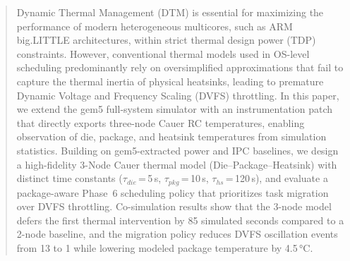 \begin{abstract}
Dynamic Thermal Management (DTM) is essential for maximizing the performance of modern heterogeneous multicores, such as ARM big.LITTLE architectures, within strict thermal design power (TDP) constraints. However, conventional thermal models used in OS-level scheduling predominantly rely on oversimplified approximations that fail to capture the thermal inertia of physical heatsinks, leading to premature Dynamic Voltage and Frequency Scaling (DVFS) throttling. In this paper, we extend the gem5 full-system simulator with an instrumentation patch that directly exports three-node Cauer RC temperatures, enabling observation of die, package, and heatsink temperatures from simulation statistics. Building on gem5-extracted power and IPC baselines, we design a high-fidelity 3-Node Cauer thermal model (Die--Package--Heatsink) with distinct time constants ($\tau_{die}$\,=\,5\,s, $\tau_{pkg}$\,=\,10\,s, $\tau_{hs}$\,=\,120\,s), and evaluate a package-aware Phase~6 scheduling policy that prioritizes task migration over DVFS throttling. Co-simulation results show that the 3-node model defers the first thermal intervention by 85 simulated seconds compared to a 2-node baseline, and the migration policy reduces DVFS oscillation events from 13 to 1 while lowering modeled package temperature by 4.5\,°C.
\end{abstract}
